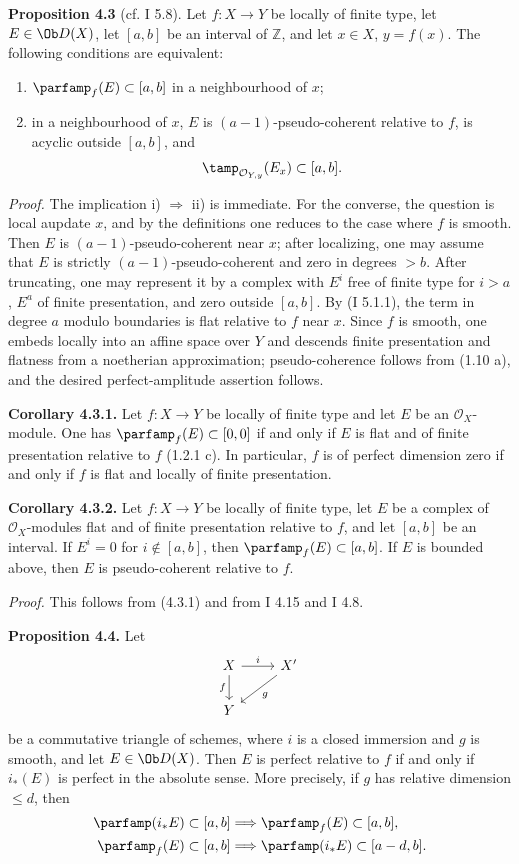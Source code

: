 \documentclass[11pt]{article}
\begin{document}
\textbf{Proposition 4.3} (cf. I 5.8). Let \(f:X\to Y\) be locally of finite type, let \(E\in\Ob D(X)\), let \([a,b]\) be an interval of \(\mathbb Z\), and let \(x\in X\), \(y=f(x)\). The following conditions are equivalent:
\begin{enumerate}[label=\roman*)]
\item \(\parfamp_f(E)\subset[a,b]\) in a neighbourhood of \(x\);
\item in a neighbourhood of \(x\), \(E\) is \((a-1)\)-pseudo-coherent relative to \(f\), is acyclic outside \([a,b]\), and
\[
 \tamp_{\mathcal O_{Y,y}}(E_x)\subset[a,b].
\]
\end{enumerate}

\emph{Proof.} The implication i) \(\Rightarrow\) ii) is immediate. For the converse, the question is local aupdate \(x\), and by the definitions one reduces to the case where \(f\) is smooth. Then \(E\) is \((a-1)\)-pseudo-coherent near \(x\); after localizing, one may assume that \(E\) is strictly \((a-1)\)-pseudo-coherent and zero in degrees \(>b\). After truncating, one may represent it by a complex with \(E^i\) free of finite type for \(i>a\), \(E^a\) of finite presentation, and zero outside \([a,b]\). By (I 5.1.1), the term in degree \(a\) modulo boundaries is flat relative to \(f\) near \(x\). Since \(f\) is smooth, one embeds locally into an affine space over \(Y\) and descends finite presentation and flatness from a noetherian approximation; pseudo-coherence follows from (1.10 a), and the desired perfect-amplitude assertion follows.

\textbf{Corollary 4.3.1.} Let \(f:X\to Y\) be locally of finite type and let \(E\) be an \(\mathcal O_X\)-module. One has \(\parfamp_f(E)\subset[0,0]\) if and only if \(E\) is flat and of finite presentation relative to \(f\) (1.2.1 c). In particular, \(f\) is of perfect dimension zero if and only if \(f\) is flat and locally of finite presentation.

\textbf{Corollary 4.3.2.} Let \(f:X\to Y\) be locally of finite type, let \(E\) be a complex of \(\mathcal O_X\)-modules flat and of finite presentation relative to \(f\), and let \([a,b]\) be an interval. If \(E^i=0\) for \(i\notin[a,b]\), then \(\parfamp_f(E)\subset[a,b]\). If \(E\) is bounded above, then \(E\) is pseudo-coherent relative to \(f\).

\emph{Proof.} This follows from (4.3.1) and from I 4.15 and I 4.8.

\textbf{Proposition 4.4.} Let
\[
\begin{tikzcd}
X \arrow[r,"i"] \arrow[d,"f"'] & X' \arrow[dl,"g"]\\
Y &
\end{tikzcd}
\]
be a commutative triangle of schemes, where \(i\) is a closed immersion and \(g\) is smooth, and let \(E\in\Ob D(X)\). Then \(E\) is perfect relative to \(f\) if and only if \(i_*(E)\) is perfect in the absolute sense. More precisely, if \(g\) has relative dimension \(\leq d\), then
\begin{align*}
\parfamp(i_*E)
  \subset[a,b]&\Longrightarrow \parfamp_f(E)
  \subset[a,b],\\
\parfamp_f(E)
  \subset[a,b]&\Longrightarrow \parfamp(i_*E)
  \subset[a-d,b].
\end{align*}
\end{document}
